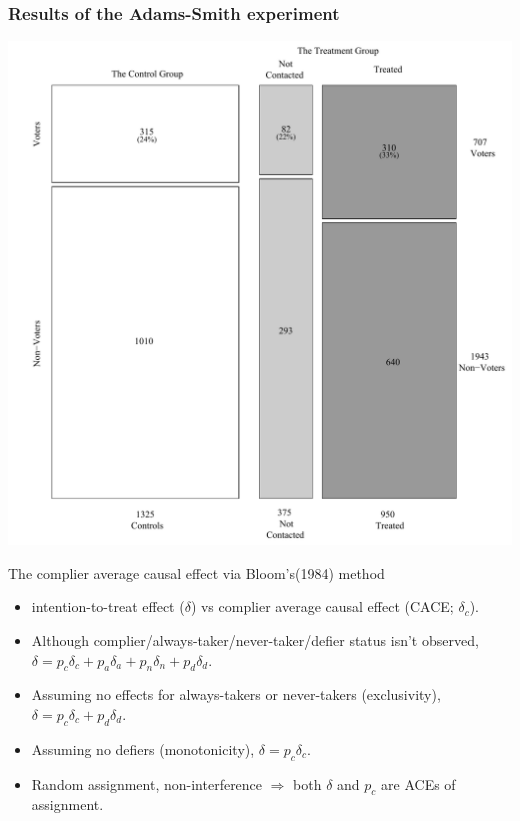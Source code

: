 \begin{frame} \frametitle{Results of the Adams-Smith experiment}
  \includegraphics[height=.9\textheight]{images/ASdesign2edited}
\end{frame}

\begin{frame}{The complier average causal effect via Bloom's(1984) method}
  \begin{itemize}
  \item intention-to-treat effect ($\delta$) vs
    complier average causal effect (CACE; $\delta_{c}$).
 \item Although complier/always-taker/never-taker/defier status isn't
   observed, $\delta = p_{c}\delta_{c} + p_{a} \delta_{a} + p_{n} \delta_{n}
   + p_{d} \delta_{d}$.
  \item Assuming no effects for always-takers or never-takers
    (exclusivity), $\delta = p_{c} \delta_{c} + p_{d} \delta_{d} $.
  \item Assuming no defiers (monotonicity), $\delta = p_{c}
    \delta_{c}$. 
  \item Random assignment, non-interference $\Rightarrow$ both $\delta$ and $p_{c}$ are ACEs of assignment.
 \end{itemize}

\end{frame}

